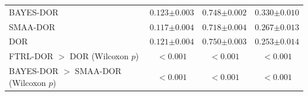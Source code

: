 \begin{table}[htp]
\begin{tabularx}{\textwidth}{l|CCC}
BAYES-DOR & $0.123{\scriptstyle\pm0.003}$ & $0.748{\scriptstyle\pm0.002}$ & $0.330{\scriptstyle\pm0.010}$ \\
SMAA-DOR & $0.117{\scriptstyle\pm0.004}$ & $0.718{\scriptstyle\pm0.004}$ & $0.267{\scriptstyle\pm0.013}$ \\
DOR & $0.121{\scriptstyle\pm0.004}$ & $0.750{\scriptstyle\pm0.003}$ & $0.253{\scriptstyle\pm0.014}$ \\
\quad FTRL-DOR $>$ DOR (Wilcoxon $p$) & $<0.001$ & $<0.001$ & $<0.001$ \\
\quad BAYES-DOR $>$ SMAA-DOR (Wilcoxon $p$) & $<0.001$ & $<0.001$ & $<0.001$ \\
\bottomrule
\end{tabularx}
\end{table}
